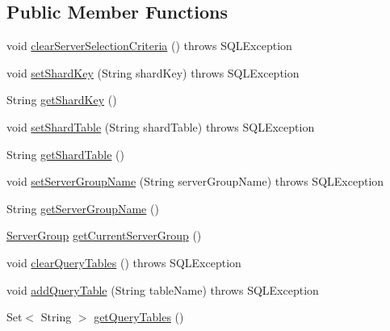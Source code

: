 \subsection*{Public Member Functions}
\begin{DoxyCompactItemize}
\item 
void \mbox{\hyperlink{interfacecom_1_1mysql_1_1fabric_1_1jdbc_1_1_fabric_my_s_q_l_connection_a7e0998ece683fdc723cf3c84c16e53be}{clear\+Server\+Selection\+Criteria}} ()  throws S\+Q\+L\+Exception
\item 
void \mbox{\hyperlink{interfacecom_1_1mysql_1_1fabric_1_1jdbc_1_1_fabric_my_s_q_l_connection_ab3be2f1efeb29e95c43ef316dd8ce0bf}{set\+Shard\+Key}} (String shard\+Key)  throws S\+Q\+L\+Exception
\item 
String \mbox{\hyperlink{interfacecom_1_1mysql_1_1fabric_1_1jdbc_1_1_fabric_my_s_q_l_connection_a109c8c07d5068f51799da6a5f64a3eb7}{get\+Shard\+Key}} ()
\item 
void \mbox{\hyperlink{interfacecom_1_1mysql_1_1fabric_1_1jdbc_1_1_fabric_my_s_q_l_connection_a5e9287d2536bd36fcc2f63d8a27a6b9b}{set\+Shard\+Table}} (String shard\+Table)  throws S\+Q\+L\+Exception
\item 
String \mbox{\hyperlink{interfacecom_1_1mysql_1_1fabric_1_1jdbc_1_1_fabric_my_s_q_l_connection_ae6b5717b5aac5a32d46b5fce83de74d7}{get\+Shard\+Table}} ()
\item 
void \mbox{\hyperlink{interfacecom_1_1mysql_1_1fabric_1_1jdbc_1_1_fabric_my_s_q_l_connection_a934f2eca033d68725f572ceab4585efc}{set\+Server\+Group\+Name}} (String server\+Group\+Name)  throws S\+Q\+L\+Exception
\item 
String \mbox{\hyperlink{interfacecom_1_1mysql_1_1fabric_1_1jdbc_1_1_fabric_my_s_q_l_connection_a67f82a83e756232c8d86a9ae8a1a0dce}{get\+Server\+Group\+Name}} ()
\item 
\mbox{\hyperlink{classcom_1_1mysql_1_1fabric_1_1_server_group}{Server\+Group}} \mbox{\hyperlink{interfacecom_1_1mysql_1_1fabric_1_1jdbc_1_1_fabric_my_s_q_l_connection_a45d6ee9742db0ea16e51e0db018a41d2}{get\+Current\+Server\+Group}} ()
\item 
void \mbox{\hyperlink{interfacecom_1_1mysql_1_1fabric_1_1jdbc_1_1_fabric_my_s_q_l_connection_a50d57924d9cec195770ff2621425e36e}{clear\+Query\+Tables}} ()  throws S\+Q\+L\+Exception
\item 
void \mbox{\hyperlink{interfacecom_1_1mysql_1_1fabric_1_1jdbc_1_1_fabric_my_s_q_l_connection_a5e830f9ef0fa1d0bae2d5dab997629c3}{add\+Query\+Table}} (String table\+Name)  throws S\+Q\+L\+Exception
\item 
Set$<$ String $>$ \mbox{\hyperlink{interfacecom_1_1mysql_1_1fabric_1_1jdbc_1_1_fabric_my_s_q_l_connection_a9f655bdcae5f7aac562367444ab61d7a}{get\+Query\+Tables}} ()
\end{DoxyCompactItemize}


